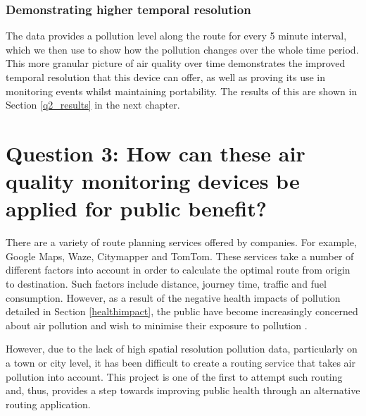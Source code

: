\documentclass[11pt]{report}
\begin{document}
\subsubsection{Demonstrating higher temporal resolution}

The data provides a pollution level along the route for every 5 minute interval, which we then use to show how the pollution changes over the whole time period. This more granular picture of air quality over time demonstrates the improved temporal resolution that this device can offer, as well as proving its use in monitoring events whilst maintaining portability. The results of this are shown in Section \ref{q2_results} in the next chapter.


\section{Question 3: How can these air quality monitoring devices be applied for public benefit?} \label{meth:q3}

There are a variety of route planning services offered by companies. For example, Google Maps, Waze, Citymapper and TomTom. These services take a number of different factors into account in order to calculate the optimal route from origin to destination. Such factors include distance, journey time, traffic and fuel consumption. However, as a result of the negative health impacts of pollution detailed in Section \ref{healthimpact}, the public have become increasingly concerned about air pollution and wish to minimise their exposure to pollution \citep{hartog2010health}.

However, due to the lack of high spatial resolution pollution data, particularly on a town or city level, it has been difficult to create a routing service that takes air pollution into account. This project is one of the first to attempt such routing \citep{sharker2014exposureroutes, Hasenfratz2015highresmapsTram} and, thus, provides a step towards improving public health through an alternative routing application.

\end{document}
